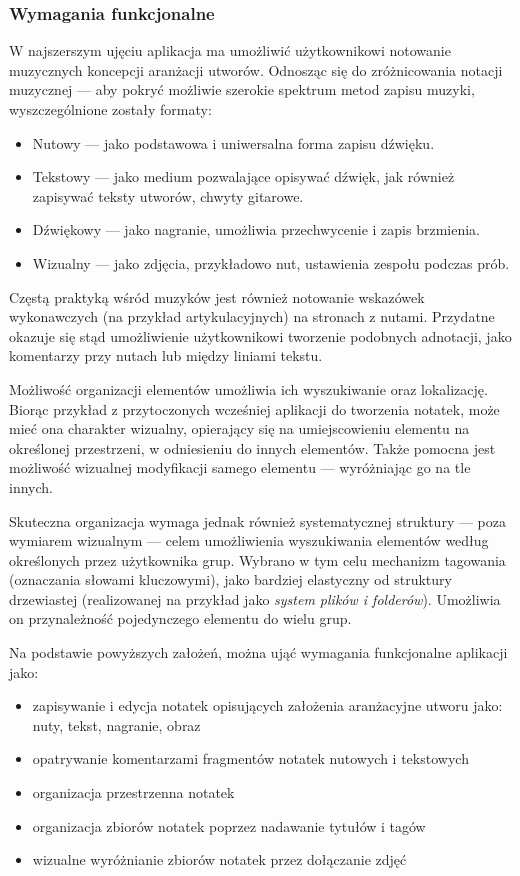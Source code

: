 \subsubsection{Wymagania funkcjonalne}
W najszerszym ujęciu aplikacja ma umożliwić użytkownikowi notowanie muzycznych koncepcji aranżacji utworów.
Odnosząc się do zróżnicowania notacji muzycznej — aby pokryć możliwie szerokie spektrum metod zapisu muzyki,
wyszczególnione zostały formaty:
\begin{itemize}
	\item Nutowy — jako podstawowa i uniwersalna forma zapisu dźwięku.
	\item Tekstowy — jako medium pozwalające opisywać dźwięk, jak również zapisywać teksty utworów, chwyty gitarowe.
	\item Dźwiękowy — jako nagranie, umożliwia przechwycenie i zapis brzmienia.
	\item Wizualny — jako zdjęcia, przykładowo nut, ustawienia zespołu podczas prób.
\end{itemize}

Częstą praktyką wśród muzyków jest również notowanie wskazówek wykonawczych (na przykład artykulacyjnych)
na stronach z nutami.
Przydatne okazuje się stąd umożliwienie użytkownikowi tworzenie podobnych adnotacji, jako komentarzy przy nutach
lub między liniami tekstu.

Możliwość organizacji elementów umożliwia ich wyszukiwanie oraz lokalizację.
Biorąc przykład z przytoczonych wcześniej aplikacji do tworzenia notatek, może mieć ona charakter wizualny,
opierający się na umiejscowieniu elementu na określonej przestrzeni, w odniesieniu do innych elementów.
Także pomocna jest możliwość wizualnej modyfikacji samego elementu — wyróżniając go na tle innych.

Skuteczna organizacja wymaga jednak również systematycznej struktury — poza wymiarem wizualnym — celem umożliwienia wyszukiwania
elementów według określonych przez użytkownika grup. Wybrano w tym celu mechanizm tagowania (oznaczania słowami kluczowymi), jako bardziej
elastyczny od struktury drzewiastej (realizowanej na przykład jako \textit{system plików i folderów}). Umożliwia on przynależność pojedynczego
elementu do wielu grup.

Na podstawie powyższych założeń, można ująć wymagania funkcjonalne aplikacji jako:
\begin{itemize}
	\item zapisywanie i edycja notatek opisujących założenia aranżacyjne utworu jako: nuty, tekst, nagranie, obraz
	\item opatrywanie komentarzami fragmentów notatek nutowych i tekstowych
	\item organizacja przestrzenna notatek
	\item organizacja zbiorów notatek poprzez nadawanie tytułów i tagów
	\item wizualne wyróżnianie zbiorów notatek przez dołączanie zdjęć
\end{itemize}

